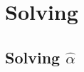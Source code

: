 \documentclass[aps,onecolumn,12pt]{revtex4}
\begin{document}

%

\section{Solving}
\subsection{Solving $\hat\alpha$}
\end{document}
